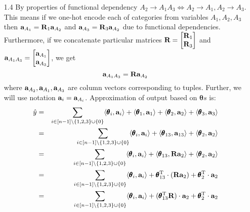 \documentclass[10pt,a4paper]{article}
\begin{document}
\begin{enumerate}
%  	
\item [1.4]
By properties of functional dependency $A_2 \rightarrow A_1A_3 \Leftrightarrow A_2 \rightarrow A_1, A_2\rightarrow A_3$. This means if we one-hot encode each of categories from variables $A_1, A_2, A_3$ then $\textbf{\text{{a}}}_{A_1} = \textbf{\text{{R}}}_1 \textbf{\text{{a}}}_{A_2}$ and $\textbf{\text{{a}}}_{A_3} = \textbf{\text{{R}}}_3 \textbf{\text{{a}}}_{A_2}$ due to functional dependencies. Furthermore, if we concatenate particular matrices $\textbf{\text{{R}}}= \begin{bmatrix}
\textbf{\text{{R}}}_1 \\ \textbf{\text{{R}}}_3
\end{bmatrix}
$  and 
$
\textbf{\text{{a}}}_{A_1A_3}= \begin{bmatrix}
\textbf{\text{{a}}}_{A_1} \\
\textbf{\text{{a}}}_{A_3}
\end{bmatrix}
$, 
we get 
\begin{equation}
\textbf{\text{{a}}}_{A_1A_3}=\textbf{\text{{R}}}\textbf{\text{{a}}}_{A_2}
\label{eq:RCHange}
\end{equation}
 where $\textbf{\text{{a}}}_{A_2}, \textbf{\text{{a}}}_{A_1}, \textbf{\text{{a}}}_{A_3}$ are column vectors corresponding to tuples. Further, we will use notation $\textbf{\text{{a}}}_i = \textbf{\text{{a}}}_{A_i}$. Approximation of output based on $\pmb{\theta} s$ is:
\begin{eqnarray}
\hat{y} &=& 
\sum_{ i\in [n-1] \setminus \{ 1, 2,3 \} \cup \{0\}} \langle \pmb{\theta}_i, \vect{a}_i \rangle + \langle \pmb{\theta}_1 , \vect{a}_1 \rangle  + \langle \pmb{\theta}_2 , \vect{a}_2 \rangle + \langle \pmb{\theta}_3, \vect{a}_3 \rangle \label{eq:initial}\\
&=&
\sum_{ i\in [n-1] \setminus \{ 1, 2,3 \} \cup \{0\}} \langle \pmb{\theta}_i, \vect{a}_i \rangle + \langle \pmb{\theta}_{13},\vect{a}_{13} \rangle  + \langle \pmb{\theta}_2, \vect{a}_2 \rangle \label{eq:concat} \\
&=&
\sum_{ i\in [n-1] \setminus \{ 1, 2,3 \}\cup \{0\}} \langle \pmb{\theta}_i, \vect{a}_i \rangle + \langle \pmb{\theta}_{13},\mat{R} \vect{a}_2 \rangle  + \langle \pmb{\theta}_2 ,\vect{a}_2 \rangle \label{eq:RNew} \\
&=&
\sum_{ i\in [n-1] \setminus \{ 1, 2,3 \}\cup \{0\}} \langle \pmb{\theta}_i, \vect{a}_i \rangle +  \transpose{\pmb{\theta}_{13}} \cdot (\mat{R} \vect{a}_2)  + \transpose{\pmb{\theta}_2 }\cdot \vect{a}_2 \label{eq:DotDef} \\
&=&
\sum_{ i\in [n-1] \setminus \{ 1, 2,3 \}\cup \{0\}} \langle \pmb{\theta}_i, \vect{a}_i \rangle + (\transpose{\pmb{\theta}_{13}} \mat{R})\cdot \vect{a}_2 + \transpose{\pmb{\theta}_2 }\cdot \vect{a}_2  \label{eq:associativity} \\

\end{eqnarray}
\end{enumerate}
\end{document}
